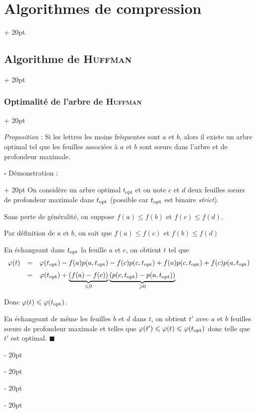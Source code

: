 \documentclass[a4paper, 12pt, twoside]{article}
\renewcommand{\le}{\leqslant}
\renewcommand{\ge}{\geqslant}
\newcommand{\ind}[1][20pt]{\advance\leftskip + #1}
\newcommand{\deind}[1][20pt]{\advance\leftskip - #1}
\newenvironment{indt}[2][20pt]{#2 \par \ind[#1]}{\par \deind} %
\begin{document}
\begin{indt}{\section{Algorithmes de compression}}
\begin{indt}{\subsection{Algorithme de \textsc{Huffman}}}
\begin{indt}{\subsubsection{Optimalité de l'arbre de \textsc{Huffman}}}
                \vspace{12pt}
                
                \begin{pseudocode}
                    \textit{Proposition} :
                    Si les lettres les moins fréquentes sont $a$ et $b$, alors il existe un arbre optimal tel que les feuilles associées à $a$ et $b$ sont s\oe urs dans l'arbre et de profondeur maximale.
                \end{pseudocode}
                
                \vspace{6pt}

                \begin{indt}{$\square$ Démonstration :}
                    On considère un arbre optimal $t_{\mathrm{opt}}$ et on note $c$ et $d$ deux feuilles s\oe urs de profondeur maximale dans $t_{\rm opt}$ (possible car $t_{\rm opt}$ est binaire \textit{strict}).

                    Sans perte de généralité, on suppose
                    $f(a) \le f(b)$ et
                    $f(c) \le f(d)$.

                    Par définition de $a$ et $b$, on sait que
                    $f(a) \le f(c)$ et
                    $f(b) \le f(d)$

                    En échangeant dans $t_{\rm opt}$ la feuille $a$ et $c$, on obtient $t$ tel que
                    \[
                        \begin{array}{rcl}
                            \varphi(t)
                            &=&
                            \varphi(t_{\rm opt})
                            - f(a) p(a, t_{\rm opt})
                            - f(c) p(c, t_{\rm opt})
                            + f(a) p(c, t_{\rm opt})
                            + f(c) p(a, t_{\rm opt})
                            \vspace{6pt}
                            \\
                            &=&
                            \varphi(t_{\rm opt})
                            + \underbrace{(f(a) - f(c))}_{\le 0}
                            \underbrace{(p(c, t_{\rm opt}) - p(a, t_{\rm opt}))}_{\ge 0}
                        \end{array}
                    \]

                    Donc $\varphi(t) \le \varphi(t_{\rm opt})$.

                    En échangeant de même les feuilles $b$ et $d$ dans $t$, on obtient $t'$ avec $a$ et $b$ feuilles s\oe urs de profondeur maximale et telles que
                    $\varphi(t') \le \varphi(t) \le \varphi(t_{\rm opt})$
                    donc telle que $t'$ est optimal. $\blacksquare$
                \end{indt}


\end{indt}
\end{indt}
\end{indt}
\end{document}
